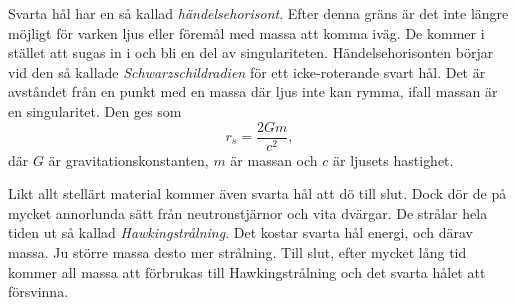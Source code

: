 Svarta hål har en så kallad \emph{händelsehorisont}. Efter denna gräns är det inte längre möjligt för varken ljus eller föremål med massa att komma iväg. De kommer i stället att sugas in i och bli en del av singulariteten. Händelsehorisonten börjar vid den så kallade \emph{Schwarzschildradien} för ett icke-roterande svart hål. Det är avståndet från en punkt med en massa där ljus inte kan rymma, ifall massan är en singularitet. Den ges som
\begin{equation}
    r_s = \frac{2Gm}{c^2},
    \label{eq:schwarzschild-radius}
\end{equation}
där $G$ är gravitationskonstanten, $m$ är massan och $c$ är ljusets hastighet.

Likt allt stellärt material kommer även svarta hål att dö till slut. Dock dör de på mycket annorlunda sätt från neutronstjärnor och vita dvärgar. De strålar hela tiden ut så kallad \emph{Hawkingstrålning}. Det kostar svarta hål energi, och därav massa. Ju större massa desto mer strålning. Till slut, efter mycket lång tid kommer all massa att förbrukas till Hawkingstrålning och det svarta hålet att försvinna.